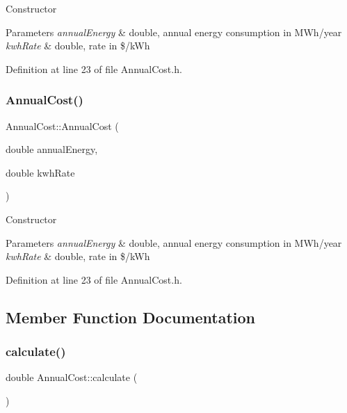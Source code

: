 Constructor 
\begin{DoxyParams}{Parameters}
{\em annual\+Energy} & double, annual energy consumption in M\+Wh/year \\
\hline
{\em kwh\+Rate} & double, rate in \$/k\+Wh \\
\hline
\end{DoxyParams}


Definition at line 23 of file Annual\+Cost.\+h.

\mbox{\label{class_annual_cost_a723513a7074d1799e2bf410b60b3146f}} 
\subsubsection{\texorpdfstring{Annual\+Cost()}{AnnualCost()}\hspace{0.1cm}{\footnotesize\ttfamily [3/3]}}
{\footnotesize\ttfamily Annual\+Cost\+::\+Annual\+Cost (\begin{DoxyParamCaption}\item[{double}]{annual\+Energy,  }\item[{double}]{kwh\+Rate }\end{DoxyParamCaption})\hspace{0.3cm}{\ttfamily [inline]}}

Constructor 
\begin{DoxyParams}{Parameters}
{\em annual\+Energy} & double, annual energy consumption in M\+Wh/year \\
\hline
{\em kwh\+Rate} & double, rate in \$/k\+Wh \\
\hline
\end{DoxyParams}


Definition at line 23 of file Annual\+Cost.\+h.



\subsection{Member Function Documentation}
\mbox{\label{class_annual_cost_adb12b66af50d01746c3f6f0d430b1fdd}} 
\subsubsection{\texorpdfstring{calculate()}{calculate()}\hspace{0.1cm}{\footnotesize\ttfamily [1/3]}}
{\footnotesize\ttfamily double Annual\+Cost\+::calculate (\begin{DoxyParamCaption}{ }\end{DoxyParamCaption})}



